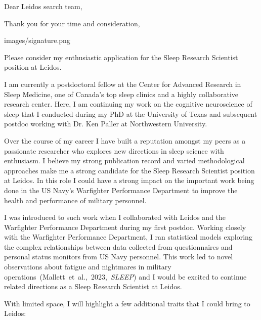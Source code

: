 \date{\today}
\subject{Sleep Research Scientist Application}
\opening{Dear Leidos search team,}
\closing{Thank you for your time and consideration,}
\signature{0.175}{images/signature.png} 
\makelettertitle

Please consider my enthusiastic application for the Sleep Research Scientist position at Leidos.

I am currently a postdoctoral fellow at the Center for Advanced Research in Sleep Medicine, one of Canada's top sleep clinics and a highly collaborative research center. Here, I am continuing my work on the cognitive neuroscience of sleep that I conducted during my PhD at the University of Texas and subsequent postdoc working with Dr. Ken Paller at Northwestern University.

Over the course of my career I have built a reputation amongst my peers as a passionate researcher who explores new directions in sleep science with enthusiasm. I believe my strong publication record and varied methodological approaches make me a strong candidate for the Sleep Research Scientist position at Leidos. In this role I could have a strong impact on the important work being done in the US Navy's Warfighter Performance Department to improve the health and performance of military personnel.

I was introduced to such work when I collaborated with Leidos and the Warfighter Performance Department during my first postdoc. Working closely with the Warfighter Performance Department, I ran statistical models exploring the complex relationships between data collected from questionnaires and personal status monitors from US Navy personnel. This work led to novel observations about fatigue and nightmares in military operations~(Mallett~et~al.,~2023,~\textit{SLEEP}) and I would be excited to continue related directions as a Sleep Research Scientist at Leidos.

With limited space, I will highlight a few additional traits that I could bring to Leidos:

\vspace{0.2em}

